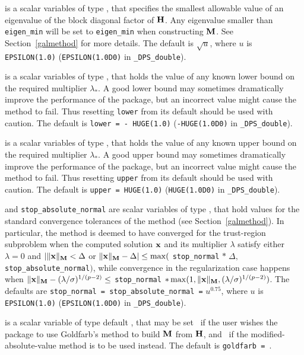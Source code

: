 \documentclass{galahad}
\newcommand{\packagename}{DPS}
\newcommand{\fullpackagename}{\libraryname\_\packagename}
\begin{document}
\begin{description}
 is a scalar variables of type \realdp, that specifies the
smallest allowable value of an eigenvalue of the block diagonal factor of
${\mathbf{H}}$. Any eigenvalue smaller than {\tt eigen\_min}
will be set to {\tt eigen\_min} when constructing ${\mathbf{M}}$.
See Section~\ref{galmethod} for more details.
The default is $\sqrt{u}$, where $u$ is
{\tt EPSILON(1.0)} ({\tt EPSILON(1.0D0)} in {\tt \fullpackagename\_double}).

 is a scalar variables of type \realdp, that holds the value
of any known lower bound on the required multiplier $\lambda_*$. A good lower
bound may sometimes dramatically improve the performance of the package, but
an incorrect value might cause the method to fail. Thus resetting
{\tt lower} from its default should be used with caution.
The default is {\tt lower = - HUGE(1.0)}
({\tt -HUGE(1.0D0)} in {\tt \fullpackagename\_double}).

 is a scalar variables of type \realdp, that holds the value
of any known upper bound on the required multiplier $\lambda_*$. A good upper
bound may sometimes dramatically improve the performance of the package, but
an incorrect value might cause the method to fail. Thus resetting
{\tt upper} from its default should be used with caution.
The default is {\tt upper = HUGE(1.0)}
({\tt HUGE(1.0D0)} in {\tt \fullpackagename\_double}).

 and {\tt stop\_absolute\_normal}
are scalar variables of type \realdp,
that hold values for the standard convergence tolerances of the method
(see Section~\ref{galmethod}).
In particular, the method is deemed to have converged for the trust-region
subproblem when the
computed solution ${\mathbf{x}}$ and its multiplier $\lambda$ satisfy either
$\lambda = 0$ and $|\|{\mathbf{x}}\|_{{\mathbf{M}}} < \Delta$ or
$\|{\mathbf{x}}\|_{{\mathbf{M}}} -  \Delta| \leq \max($ {\tt stop\_normal} $\ast \; \Delta,$
{\tt stop\_absolute\_normal}$)$,
while convergence in the regularization case happens when
$\|{\mathbf{x}}\|_{{\mathbf{M}}} -  (\lambda/\sigma)^{1/(p-2)} \leq$ {\tt stop\_normal}
\linebreak $\ast \max(1,\|{\mathbf{x}}\|_{{\mathbf{M}}},(\lambda/\sigma)^{1/(p-2)})$.
The defaults are {\tt stop\_normal = \tt stop\_absolute\_normal =}
$u^{0.75}$,
where $u$ is {\tt EPSILON(1.0)} ({\tt EPSILON(1.0D0)} in
{\tt \fullpackagename\_double}).

 is a scalar variable of type default \logical, that
may be set \true\ if the user wishes the package to use Goldfarb's
method to build ${\mathbf{M}}$ from ${\mathbf{H}}$, and \false\ if the modified-absolute-value
method is to be used instead.
The default is {\tt goldfarb = \false}.


\end{description}
\end{document}
